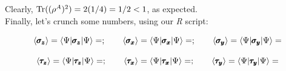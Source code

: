 \documentclass[solutions.tex]{subfiles}
\begin{document}
Clearly, $\text{Tr}((\rho^A)^2) = 2(1/4) = 1/2 < 1$, as expected. \\


Finally, let's crunch some numbers, using our \textit{R} script:

\[
	\avg{\bm{\sigma_z}} = \bra{\Psi}\bm{\sigma_z}\ket{\Psi} =
		;\qquad
	\avg{\bm{\sigma_x}} = \bra{\Psi}\bm{\sigma_x}\ket{\Psi} =
		;\qquad
	\avg{\bm{\sigma_y}} = \bra{\Psi}\bm{\sigma_y}\ket{\Psi} =
		
\]

\[
	\avg{\bm{\tau_z}} = \bra{\Psi}\bm{\tau_z}\ket{\Psi} =
		;\qquad
	\avg{\bm{\tau_x}} = \bra{\Psi}\bm{\tau_x}\ket{\Psi} =
		;\qquad
	\avg{\bm{\tau_y}} = \bra{\Psi}\bm{\tau_y}\ket{\Psi} =
		
\]
\end{document}
